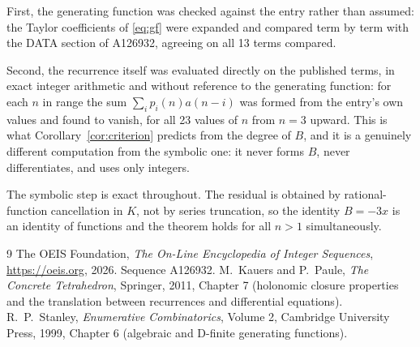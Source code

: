 \documentclass[11pt,a4paper]{article}
\theoremstyle{plain}
\theoremstyle{definition}
\begin{document}
First, the generating function was checked against the entry rather than assumed: the
Taylor coefficients of \eqref{eq:gf} were expanded and compared term by term with the DATA
section of A126932, agreeing on all 13 terms compared.

Second, the recurrence itself was evaluated directly on the published terms, in exact
integer arithmetic and without reference to the generating function: for each $n$ in range
the sum $\sum_{i}p_{i}(n)a(n-i)$ was formed from the entry's own values and found to
vanish, for all 23 values of $n$ from $n=3$ upward. This is what
Corollary~\ref{cor:criterion} predicts from the degree of $B$, and it is a genuinely
different computation from the symbolic one: it never forms $B$, never differentiates, and
uses only integers.

The symbolic step is exact throughout. The residual is obtained by rational-function
cancellation in $K$, not by series truncation, so the identity $B=- 3 x$ is an
identity of functions and the theorem holds for all $n>1$ simultaneously.

\begin{thebibliography}{9}
 The OEIS Foundation, \emph{The On-Line Encyclopedia of Integer Sequences},
\url{https://oeis.org}, 2026. Sequence A126932.
 M.~Kauers and P.~Paule, \emph{The Concrete Tetrahedron}, Springer, 2011,
Chapter 7 (holonomic closure properties and the translation between recurrences and
differential equations).
 R.~P.~Stanley, \emph{Enumerative Combinatorics}, Volume 2, Cambridge
University Press, 1999, Chapter 6 (algebraic and D-finite generating functions).
\end{thebibliography}
\end{document}
